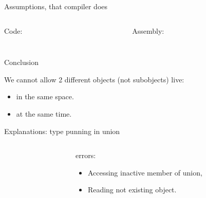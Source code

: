 \documentclass{panicsoftware-presentation}
\makeatletter
\newenvironment{itemizeSeq}{\begin{itemize}[<+-|alert@+>]}{\end{itemize}}
\makeatother
\begin{document}
\begin{frame}{Assumptions, that compiler does}

\begin{columns}[t]

\begin{column}{0.58\linewidth}


\centerline{Code:}

\vfill

\inputminted[firstline=5]{\myCpp}{examples/Non-TBAA-simple-example.cpp}

\end{column}


\begin{column}{0.28\linewidth}

\centerline{Assembly:}

\vfill

\centering\inputminted{gas}{examples/Non-TBAA-simple-asembly.asm}

\end{column}

\end{columns}

\end{frame}

\begin{frame}{Conclusion}

We cannot allow 2 different objects (not subobjects) live:

\begin{itemize}
	\item in the same space.
	\item at the same time.
\end{itemize}

\end{frame}

\begin{frame}{Explanations: type punning in union}

\begin{columns}

\begin{column}{0.48\linewidth}
\inputminted{\myCpp}{examples/invalid_union_use.cpp}
\end{column}
\begin{column}{0.48\linewidth}

\centerline{\alert{errors:}}

\begin{itemizeSeq}
\item Accessing inactive member of union,
\item Reading not existing object.
\end{itemizeSeq}

\end{column}

\end{columns}


\end{frame}
\end{document}
